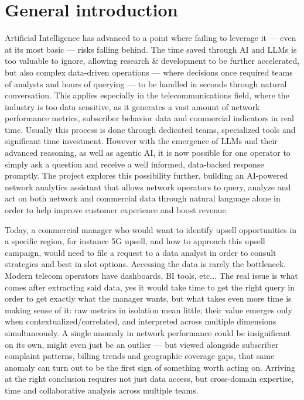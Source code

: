 \chapter*{General introduction}
Artificial Intelligence has advanced to a point where failing to leverage it — even at its most basic — risks falling behind. The time saved through AI and LLMs is too valuable to ignore, allowing research \& development to be further accelerated, but also complex data-driven operations — where decisions once required teams of analysts and hours of querying — to be handled in seconds through natural conversation. This applies especially in the telecommunications field, where the industry is too data sensitive, as it generates a vast amount of network performance metrics, subscriber behavior data and commercial indicators in real time. Usually this process is done through dedicated teams, specialized tools and significant time investment. However with the emergence of LLMs and their advanced reasoning, as well as agentic AI, it is now possible for one operator to simply ask a question and receive a well informed, data-backed response promptly. The project explores this possibility further, building an AI-powered network analytics assistant that allows network operators to query, analyze and act on both network and commercial data through natural language alone in order to help improve customer experience and boost revenue.

Today, a commercial manager who would want to identify upsell opportunities in a specific region, for instance 5G upsell, and how to approach this upsell campaign, would need to file a request to a data analyst in order to consult strategies and best in slot options. Accessing the data is rarely the bottleneck. Modern telecom operators have dashboards, BI tools, etc... The real issue is what comes after extracting said data, yes it would take time to get the right query in order to get exactly what the manager wants, but what takes even more time is making sense of it: raw metrics in isolation mean little; their value emerges only when contextualized/correlated, and interpreted across multiple dimensions simultaneously. A single anomaly in network performance could be insignificant on its own, might even just be an outlier — but viewed alongside subscriber complaint patterns, billing trends and geographic coverage gaps, that same anomaly can turn out to be the first sign of something worth acting on. Arriving at the right conclusion requires not just data access, but cross-domain expertise, time and collaborative analysis across multiple teams.

